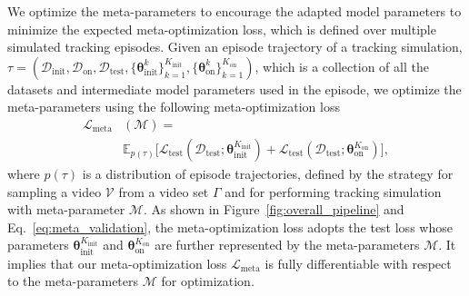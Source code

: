 \documentclass[letterpaper]{article} %
\newcommand{\hyeonwoo}[1]{{\color{red}{HW: #1}}}
\def \datainit{\mathcal{D}_\text{init}}
\def \dataonline{\mathcal{D}_\text{on}}
\def \dataval{\mathcal{D}_\text{test}}
\def \thetainitadapt{\boldsymbol{\theta}_\text{init}}
\def \thetaonlineadapt{\boldsymbol{\theta}_\text{on}}
\def \Kinit{K_\text{init}}
\def \Konline{K_\text{on}}
\def \lossval{\mathcal{L}_\text{test}}
\def \lossmeta{\mathcal{L}_\text{meta}}
\begin{document}
We optimize the meta-parameters to encourage the adapted model parameters to minimize the expected meta-optimization loss, which is defined over multiple simulated tracking episodes.
Given an episode trajectory of a tracking simulation, $\tau=(\datainit, \dataonline, \dataval, \{\thetainitadapt^k\}_{k=1}^{\Kinit}, \{\thetaonlineadapt^k\}_{k=1}^{\Konline})$, which is a collection of all the datasets and intermediate model parameters used in the episode, we optimize the meta-parameters using the following meta-optimization loss
%
\begin{align}
\label{eq:meta_validation}
\lossmeta&(\mathcal{M}) = \\
&\mathbb{E}_{p(\tau)}\big[\lossval(\dataval;\thetainitadapt^{\Kinit}) + \lossval(\dataval;\thetaonlineadapt^{\Konline})\big], \nonumber
\end{align}
%
where $p(\tau)$ is a distribution of episode trajectories, defined by the strategy for sampling a video $\mathcal{V}$ from a video set $\Gamma$ and for performing tracking simulation with meta-parameter $\mathcal{M}$.
As shown in Figure~\ref{fig:overall_pipeline} and Eq.~\eqref{eq:meta_validation}, the meta-optimization loss adopts the test loss whose parameters $\thetainitadapt^{\Kinit}$ and $\thetaonlineadapt^{\Konline}$ are further represented by the meta-parameters $\mathcal{M}$.
It implies that our meta-optimization loss $\lossmeta$ is fully differentiable with respect to the meta-parameters $\mathcal{M}$ for optimization.
%
%
\end{document}
